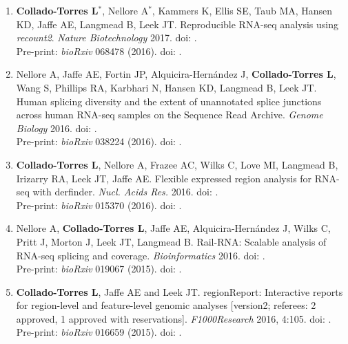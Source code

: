 \begin{enumerate}
        \item \textbf{Collado-Torres L}$^{*}$, Nellore A$^{*}$, Kammers K, Ellis SE, Taub MA, Hansen KD, Jaffe AE, Langmead B, Leek JT. Reproducible RNA-seq analysis using \emph{recount2}. \emph{Nature Biotechnology} 2017. doi: .
        \\ Pre-print: \emph{bioRxiv} 068478 (2016). doi: .
        
        \item Nellore A, Jaffe AE, Fortin JP, Alquicira-Hernández J, \textbf{Collado-Torres L}, Wang S, Phillips RA, Karbhari N, Hansen KD, Langmead B, Leek JT. Human splicing diversity and the extent of unannotated splice junctions across human RNA-seq samples on the Sequence Read Archive. \emph{Genome Biology} 2016. doi: .
        \\ Pre-print: \emph{bioRxiv} 038224 (2016). doi: .
        
        \item \textbf{Collado-Torres L}, Nellore A, Frazee AC, Wilks C, Love MI, Langmead B, Irizarry RA, Leek JT, Jaffe AE. Flexible expressed region analysis for RNA-seq with derfinder. \emph{Nucl. Acids Res.} 2016. doi: .
        \\ Pre-print: \emph{bioRxiv} 015370 (2016). doi: .
        
        \item Nellore A, \textbf{Collado-Torres L}, Jaffe AE, Alquicira-Hernández J, Wilks C, Pritt J, Morton J, Leek JT, Langmead B. Rail-RNA: Scalable analysis of RNA-seq splicing and coverage. \emph{Bioinformatics} 2016. doi: .
        \\ Pre-print: \emph{bioRxiv} 019067 (2015). doi: .
        
        \item \textbf{Collado-Torres L}, Jaffe AE and Leek JT. regionReport: Interactive reports for region-level and feature-level genomic analyses [version2; referees: 2 approved, 1 approved with reservations]. \emph{F1000Research} 2016, 4:105. doi: .
        \\ Pre-print: \emph{bioRxiv} 016659 (2015). doi: .
        

\end{enumerate}
